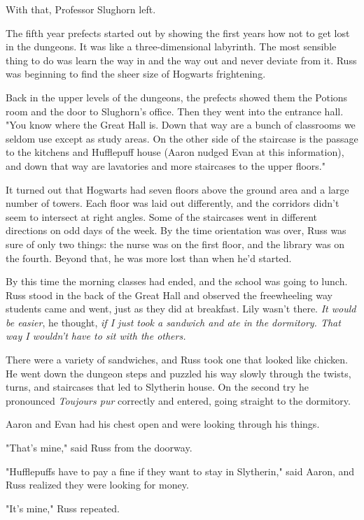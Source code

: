 With that, Professor Slughorn left.

The fifth year prefects started out by showing the first years how not to get lost in the dungeons. It was like a three-dimensional labyrinth. The most sensible thing to do was learn the way in and the way out and never deviate from it. Russ was beginning to find the sheer size of Hogwarts frightening.

Back in the upper levels of the dungeons, the prefects showed them the Potions room and the door to Slughorn's office. Then they went into the entrance hall. "You know where the Great Hall is. Down that way are a bunch of classrooms we seldom use except as study areas. On the other side of the staircase is the passage to the kitchens and Hufflepuff house (Aaron nudged Evan at this information), and down that way are lavatories and more staircases to the upper floors."

It turned out that Hogwarts had seven floors above the ground area and a large number of towers. Each floor was laid out differently, and the corridors didn't seem to intersect at right angles. Some of the staircases went in different directions on odd days of the week. By the time orientation was over, Russ was sure of only two things: the nurse was on the first floor, and the library was on the fourth. Beyond that, he was more lost than when he'd started.

By this time the morning classes had ended, and the school was going to lunch. Russ stood in the back of the Great Hall and observed the freewheeling way students came and went, just as they did at breakfast. Lily wasn't there. \emph{It would be easier}, he thought, \emph{if I just took a sandwich and ate in the dormitory. That way I wouldn't have to sit with the others.}

There were a variety of sandwiches, and Russ took one that looked like chicken. He went down the dungeon steps and puzzled his way slowly through the twists, turns, and staircases that led to Slytherin house. On the second try he pronounced \emph{Toujours pur} correctly and entered, going straight to the dormitory.

Aaron and Evan had his chest open and were looking through his things.

"That's{\el} mine," said Russ from the doorway.

"Hufflepuffs have to pay a fine if they want to stay in Slytherin," said Aaron, and Russ realized they were looking for money.

"It's mine," Russ repeated.

